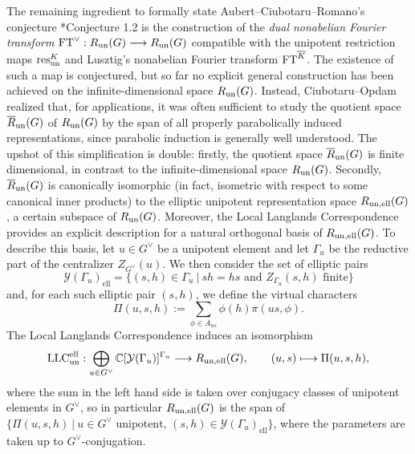 The remaining ingredient to formally state Aubert--Ciubotaru--Romano's conjecture \cite{AubertCiubotaruRomano2024}*{Conjecture 1.2} is the construction of the \textit{dual nonabelian Fourier transform} $\mathrm{FT}^\vee:R_{\mathrm{un}}(G)\longrightarrow R_{\mathrm{un}}(G)$ compatible with the unipotent restriction maps $\mathrm{res}_{\mathrm{un}}^K$ and Lusztig's nonabelian Fourier transform $\mathrm{FT}^{\overline{K}}$. The existence of such a map is conjectured, but so far no explicit general construction has been achieved on the infinite-dimensional space $R_{\mathrm{un}}(G)$. Instead, Ciubotaru--Opdam \cite{CiubotaruOpdam2010} realized that, for applications, it was often sufficient to study the quotient space $\overline{R}_{\mathrm{un}}(G)$ of $R_{\mathrm{un}}(G)$ by the span of all properly parabolically induced representations, since parabolic induction is generally well understood. The upshot of this simplification is double: firstly, the quotient space $\overline{R}_{\mathrm{un}}(G)$ is finite dimensional, in contrast to the infinite-dimensional space $R_{\mathrm{un}}(G)$. Secondly, $\overline{R}_{\mathrm{un}}(G)$ is canonically isomorphic (in fact, isometric with respect to some canonical inner products) to the elliptic unipotent representation space $R_{\mathrm{un},\mathrm{ell}}(G)$, a certain subspace of $R_{\mathrm{un}}(G)$. Moreover, the Local Langlands Correspondence provides an explicit description for a natural orthogonal basis of $R_{\mathrm{un},\mathrm{ell}}(G)$. To describe this basis, let $u\in G^\vee$ be a unipotent element and let $\Gamma_u$ be the reductive part of the centralizer $Z_{G^\vee}(u)$. We then consider the set of elliptic pairs 
$$\mathcal{Y}(\Gamma_u)_{\mathrm{ell}}=\{(s,h)\in\Gamma_u\ |\ sh=hs\text{ and }Z_{\Gamma_u}(s,h)\text{ finite}\}$$
and, for each such elliptic pair $(s,h)$, we define the virtual characters 
$$\Pi(u,s,h):=\sum_{\phi\in A_{us}}\phi(h)\pi(us,\phi).$$
The Local Langlands Correspondence induces an isomorphism
\begin{equation*}
    \mathrm{LLC}^{\mathrm{ell}}_{\mathrm{un}}:\bigoplus_{u\in G^\vee}\mathbb{C}[\mathcal{Y}(\Gamma_u)]^{\Gamma_u}\longrightarrow R_{\mathrm{un},\mathrm{ell}}(G),\quad\quad (u,s)\longmapsto\Pi(u,s,h),
\end{equation*}
where the sum in the left hand side is taken over conjugacy classes of unipotent elements in $G^\vee$, so in particular $R_{\mathrm{un},\mathrm{ell}}(G)$ is the span of $\{\Pi(u,s,h)\ | \ u\in G^\vee\text{ unipotent, }(s,h)\in\mathcal{Y}(\Gamma_u)_{\mathrm{ell}}\}$, where the parameters are taken up to $G^\vee$-conjugation.

